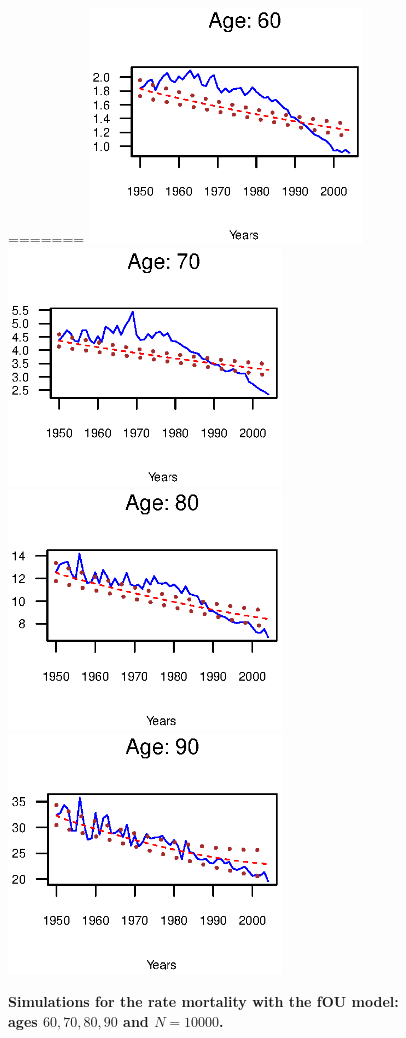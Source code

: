 \documentclass[smallextended]{svjour3}
\begin{document}
\begin{figure}[H]
    \caption{\bf Simulations for the rate mortality with the fOU model: ages
    $60,70,80,90$ and $N=10000$.}
=======
    \includegraphics[width = 2.85in]{PlotMen60.eps}
    \includegraphics[width = 2.85in]{PlotMen70.eps}
    \includegraphics[width = 2.85in]{PlotMen80.eps}
    \includegraphics[width = 2.85in]{PlotMen90.eps}

\end{figure}
\end{document}
